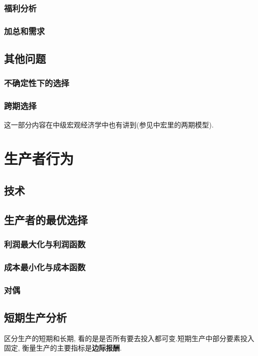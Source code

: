 \documentclass[lang=cn,10pt]{elegantbook}
\begin{document}
\subsection{福利分析}
\newpage

\subsection{加总和需求}
\newpage

\section{其他问题}
\newpage

\subsection{不确定性下的选择}
\newpage

\subsection{跨期选择}
这一部分内容在中级宏观经济学中也有讲到(参见中宏里的两期模型).
\newpage

\chapter{生产者行为}
\section{技术}
\section{生产者的最优选择}
\subsection{利润最大化与利润函数}
\subsection{成本最小化与成本函数}
\subsection{对偶}
\section{短期生产分析}
区分生产的短期和长期, 看的是是否所有要去投入都可变.短期生产中部分要素投入固定, 衡量生产的主要指标是\textbf{边际报酬}.
\end{document}
